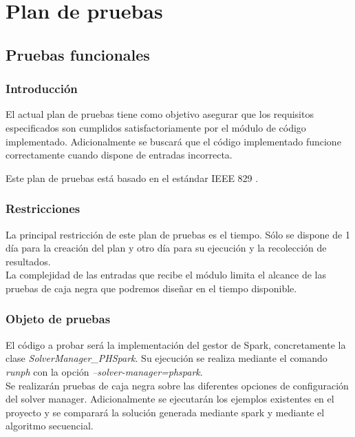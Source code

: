 \chapter{Plan de pruebas}
\label{sec:pruebas}

\section{Pruebas funcionales}

\subsection{Introducción}

El actual plan de pruebas tiene como objetivo asegurar que los requisitos especificados son cumplidos satisfactoriamente por el módulo de código implementado. Adicionalmente se buscará que el código implementado funcione correctamente cuando dispone de entradas incorrecta.

Este plan de pruebas está basado en el estándar IEEE 829 \cite{IEEE829}.

\subsection{Restricciones}

La principal restricción de este plan de pruebas es el tiempo. Sólo se dispone de 1 día para la creación del plan y otro día para su ejecución y la recolección de resultados.\\

La complejidad de las entradas que recibe el módulo limita el alcance de las pruebas de caja negra que podremos diseñar en el tiempo disponible.

\subsection{Objeto de pruebas}

El código a probar será la implementación del gestor de Spark, concretamente la clase {\it SolverManager\_PHSpark}. Su ejecución se realiza mediante el comando {\it runph} con la opción {\it --solver-manager=phspark}.\\

Se realizarán pruebas de caja negra sobre las diferentes opciones de configuración del solver manager. Adicionalmente se ejecutarán los ejemplos existentes en el proyecto y se comparará la solución generada mediante spark y mediante el algoritmo secuencial.

